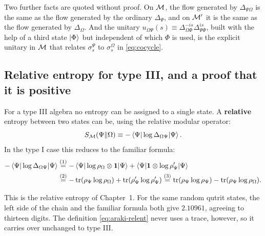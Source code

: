 Two further facts are quoted without proof. On $\mathcal{M}$, the flow generated by $\Delta_{\Psi\Omega}$ is the same
as the flow generated by the ordinary $\Delta_\Psi$, and on $\mathcal{M}'$ it is the same as the flow generated by
$\Delta_\Omega$. And the unitary $u_{\Omega\Psi}(s)\equiv\Delta_{\Omega\Phi}^{-is}\Delta_{\Psi\Phi}^{is}$,
built with the help of a third state $\ket\Phi$ but independent of which $\Phi$ is used, is the explicit
unitary in $\mathcal{M}$ that relates $\sigma_s^\Psi$ to $\sigma_s^\Omega$ in \eqref{eq:cocycle}.

\subsection*{Relative entropy for type III, and a proof that it is positive}

For a type III algebra no entropy can be assigned to a single state. A \textbf{relative} entropy between two
states can be, using the relative modular operator:
\begin{equation}
S_{\mathcal{M}}(\Psi\|\Omega) \equiv -\braket{\Psi|\log\Delta_{\Omega\Psi}|\Psi} .
\label{eq:araki-relent}
\end{equation}
In the type I case this reduces to the familiar formula:
\begin{align}
-\braket{\Psi|\log\Delta_{\Omega\Psi}|\Psi}
&\overset{(1)}{=} -\braket{\Psi|\log\rho_\Omega\otimes\mathbf{1}|\Psi} + \braket{\Psi|\mathbf{1}\otimes\log\rho_\Psi'|\Psi}
\notag\\
&\overset{(2)}{=} -\operatorname{tr}(\rho_\Psi\log\rho_\Omega) + \operatorname{tr}(\rho'_\Psi\log\rho'_\Psi)
\overset{(3)}{=} \operatorname{tr}(\rho_\Psi\log\rho_\Psi) - \operatorname{tr}(\rho_\Psi\log\rho_\Omega) .
\notag
\end{align}
\quad
{}\quad
{}

This is the relative entropy of Chapter~1. For the same random qutrit states, the left side of the chain and
the familiar formula both give $2.10961$, agreeing to thirteen digits. The definition \eqref{eq:araki-relent}
never uses a trace, however, so it carries over unchanged to type III.


